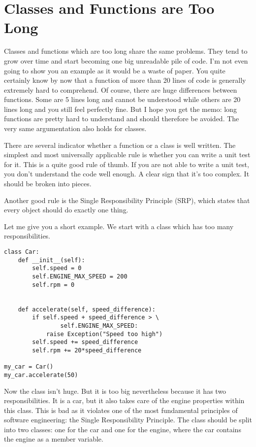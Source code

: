 \section{Classes and Functions are Too Long}

Classes and functions which are too long share the same problems. They tend to grow over time and start becoming one big unreadable pile of code. I'm not even going to show you an example as it would be a waste of paper. You quite certainly know by now that a function of more than 20 lines of code is generally extremely hard to comprehend. Of course, there are huge differences between functions. Some are 5 lines long and cannot be understood while others are 20 lines long and you still feel perfectly fine. But I hope you get the memo: long functions are pretty hard to understand and should therefore be avoided. The very same argumentation also holds for classes.

There are several indicator whether a function or a class is well written. The simplest and most universally applicable rule is whether you can write a unit test for it. This is a quite good rule of thumb. If you are not able to write a unit test, you don't understand the code well enough. A clear sign that it's too complex. It should be broken into pieces.

Another good rule is the Single Responsibility Principle (SRP), which states that every object should do exactly one thing. 

Let me give you a short example. We start with a class  which has too many responsibilities.

\begin{programcode}{}\label{prog:car}
\begin{verbatim}
class Car:
    def __init__(self):
        self.speed = 0
        self.ENGINE_MAX_SPEED = 200
        self.rpm = 0

        
    def accelerate(self, speed_difference):
        if self.speed + speed_difference > \
                self.ENGINE_MAX_SPEED:
            raise Exception("Speed too high")
        self.speed += speed_difference
        self.rpm += 20*speed_difference

my_car = Car()
my_car.accelerate(50)
\end{verbatim}
\end{programcode}

Now the class isn't huge. But it is too big nevertheless because it has two responsibilities. It is a car, but it also takes care of the engine properties within this class. This is bad as it violates one of the most fundamental principles of software engineering: the Single Responsibility Principle. The class should be split into two classes: one for the car and one for the engine, where the car contains the engine as a member variable.

